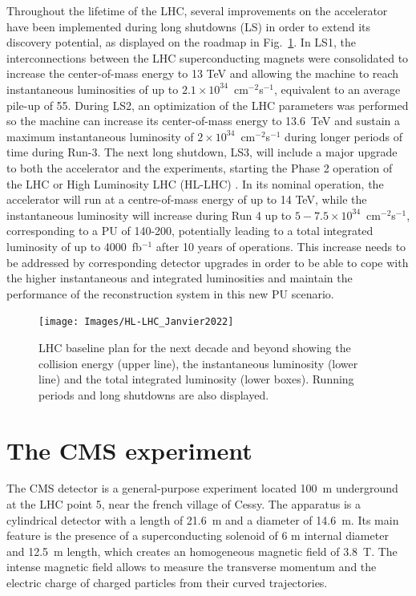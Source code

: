 \documentclass[../main.tex]{subfiles}
\begin{document}
Throughout the lifetime of the LHC, several improvements on the accelerator have been implemented during long shutdowns (LS) in order to extend its discovery potential, as displayed on the roadmap in Fig.~\ref{intro:exp:lhc_roadmap}. In LS1, the interconnections between the LHC superconducting magnets were consolidated to increase the center-of-mass energy to 13 TeV and allowing the machine to reach instantaneous luminosities of up to $2.1\times10^{34}$~cm${}^{-2}$s${}^{-1}$, equivalent to an average pile-up of 55. During LS2, an optimization of the LHC parameters was performed so the machine can increase its center-of-mass energy to 13.6~TeV and sustain a maximum instantaneous luminosity of $2\times10^{34}$~cm${}^{-2}$s${}^{-1}$ during longer periods of time during Run-3. The next long shutdown, LS3, will include a major upgrade to both the accelerator and the experiments, starting the Phase 2 operation of the LHC or High Luminosity LHC (HL-LHC) \cite{intro:exp:hllhc}. In its nominal operation, the accelerator will run at a centre-of-mass energy of up to 14 TeV, while the instantaneous luminosity will increase during Run 4 up to $5-7.5\times10^{34}$~cm${}^{-2}$s${}^{-1}$, corresponding to a PU of 140-200, potentially leading to a total integrated luminosity of up to 4000~fb${}^{-1}$ after 10 years of operations. This increase needs to be addressed by corresponding detector upgrades in order to be able to cope with the higher instantaneous and integrated luminosities and maintain the performance of the reconstruction system in this new PU scenario.

\begin{figure}[h!]
\begin{center}
\texttt{[image: Images/HL-LHC\_Janvier2022]}
\end{center}
\caption[LHC baseline schedule]{LHC baseline plan for the next decade and beyond showing the collision energy (upper line), the instantaneous luminosity (lower line) and the total integrated luminosity (lower boxes). Running periods and long shutdowns are also displayed.}
\label{intro:exp:lhc_roadmap}
\end{figure}



\section{The CMS experiment}

The CMS detector \cite{intro:exp:cms} is a general-purpose experiment located 100~m underground at the LHC point 5, near the french village of Cessy. The apparatus is a cylindrical detector with a length of 21.6~m and a diameter of 14.6~m. Its main feature is the presence of a superconducting solenoid of 6 m internal diameter and 12.5~m length, which creates an homogeneous magnetic field of 3.8~T. The intense magnetic field allows to measure the transverse momentum and the electric charge of charged particles from their curved trajectories.
\end{document}
